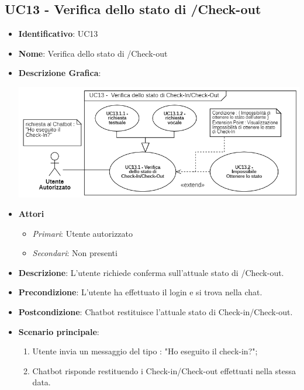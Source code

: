 \subsection{UC13 - Verifica dello stato di /Check-out}
\begin{itemize}
	\item \textbf{Identificativo}: UC13
	\item \textbf{Nome}: Verifica dello stato di /Check-out
	\item\textbf{Descrizione Grafica}: 
	\begin{center}
		\includegraphics[scale=0.65]{images/UC13.png} 
	\end{center}

	\item \textbf{Attori}
	\begin{itemize} 
		\item \textit{Primari}: Utente autorizzato
		\item \textit{Secondari}: Non presenti
	\end{itemize}
	\item \textbf{Descrizione}: L'utente richiede conferma sull'attuale stato di /Check-out.
	\item \textbf{Precondizione}: L'utente ha effettuato il login e si trova nella chat.
	\item \textbf{Postcondizione}: Chatbot restituisce l'attuale stato di Check-in/Check-out.
	\item \textbf{Scenario principale}:  \begin{enumerate}
		\item Utente invia un messaggio del tipo : "Ho eseguito il check-in?";
		\item Chatbot risponde restituendo i Check-in/Check-out effettuati nella stessa data.
	\end{enumerate}
\end{itemize}

